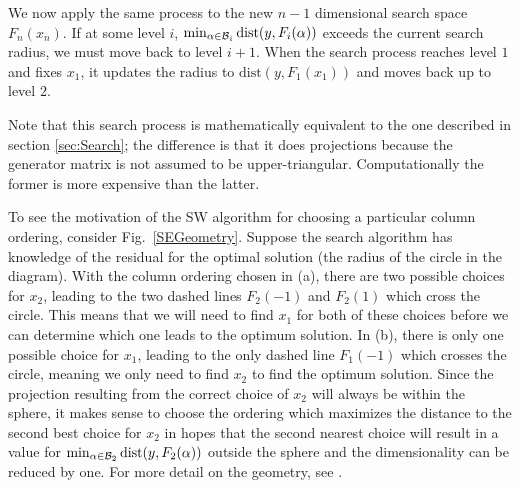 \documentclass[conference]{IEEEtran}
\newcommand{\dist}{\mathrm{dist}}
\begin{document}
We now apply the same process to the new $n-1$ dimensional search space
$F_n(x_n)$. If at some level $i$, $\min_{\alpha\in {\cal B}_i}\dist(y,F_i(\alpha))$ exceeds the current
search radius, we must move back to level $i+1$. %
When the search process reaches level $1$ and fixes $x_1$, it updates the radius to  
$\dist(y,F_1(x_1))$ and moves back up to level $2$.

Note that this search process is mathematically equivalent to the one described in section
\ref{sec:Search}; the difference is that it  does projections
because  the generator matrix is not assumed to be upper-triangular. 
Computationally the former is more expensive than the latter.

To see the motivation of the SW algorithm for choosing a particular column ordering,
consider Fig.\ \ref{SEGeometry}. Suppose the search algorithm has knowledge of
the residual for the optimal solution (the radius of the circle in the diagram).
With the column ordering chosen in (a), there are two possible choices for $x_2$,
leading to the two dashed lines $F_2(-1)$ and $F_2(1)$ which cross the circle. This means
that we will need to find $x_1$ for both of these choices
before we can determine which one leads to the optimum solution. In (b), there
is only one possible choice for $x_1$,  leading to the only dashed line $F_1(-1)$
which crosses the circle, meaning we only need to find $x_2$ to find the optimum solution.
Since the projection resulting from the correct choice of $x_2$ will always be
within the sphere, it makes sense to choose the ordering which maximizes the
distance to the second best choice for $x_2$ in hopes that the second nearest
choice will result in a value for $\min_{\alpha\in {\cal B}_2}\dist(y,F_2(\alpha))$ outside the sphere and the
dimensionality can be reduced by one. 
For more detail on the geometry, see  \cite{SuW05}.
\end{document}
